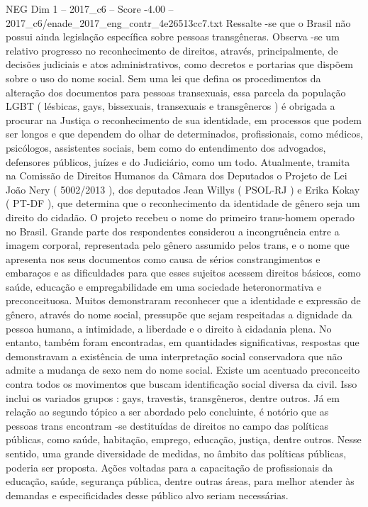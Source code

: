 \begin{textsample}{NEG Dim 1 – 2017\_c6 – Score -4.00 – 2017\_c6/enade\_2017\_eng\_contr\_4e26513cc7.txt}
Ressalte -se que o Brasil não possui ainda legislação específica sobre pessoas transgêneras.
Observa -se um relativo progresso no reconhecimento de direitos, através, principalmente, de decisões judiciais e atos administrativos, como decretos e portarias que dispõem sobre o uso do nome social.
Sem uma lei que defina os procedimentos da alteração dos documentos para pessoas transexuais, essa parcela da população LGBT ( lésbicas, gays, bissexuais, transexuais e transgêneros ) é obrigada a procurar na Justiça o reconhecimento de sua identidade, em processos que podem ser longos e que dependem do olhar de determinados, profissionais, como médicos, psicólogos, assistentes sociais, bem como do entendimento dos advogados, defensores públicos, juízes e do Judiciário, como um todo.
Atualmente, tramita na Comissão de Direitos Humanos da Câmara dos Deputados o Projeto de Lei João Nery ( 5002/2013 ), dos deputados Jean Willys ( PSOL-RJ ) e Erika Kokay ( PT-DF ), que determina que o reconhecimento da identidade de gênero seja um direito do cidadão.
O projeto recebeu o nome do primeiro trans-homem operado no Brasil.
Grande parte dos respondentes considerou a incongruência entre a imagem corporal, representada pelo gênero assumido pelos trans, e o nome que apresenta nos seus documentos como causa de sérios constrangimentos e embaraços e as dificuldades para que esses sujeitos acessem direitos básicos, como saúde, educação e empregabilidade em uma sociedade heteronormativa e preconceituosa.
Muitos demonstraram reconhecer que a identidade e expressão de gênero, através do nome social, pressupõe que sejam respeitadas a dignidade da pessoa humana, a intimidade, a liberdade e o direito à cidadania plena.
No entanto, também foram encontradas, em quantidades significativas, respostas que demonstravam a existência de uma interpretação social conservadora que não admite a mudança de sexo nem do nome social.
Existe um acentuado preconceito contra todos os movimentos que buscam identificação social diversa da civil.
Isso inclui os variados grupos : gays, travestis, transgêneros, dentre outros.
Já em relação ao segundo tópico a ser abordado pelo concluinte, é notório que as pessoas trans encontram -se destituídas de direitos no campo das políticas públicas, como saúde, habitação, emprego, educação, justiça, dentre outros.
Nesse sentido, uma grande diversidade de medidas, no âmbito das políticas públicas, poderia ser proposta.
Ações voltadas para a capacitação de profissionais da educação, saúde, segurança pública, dentre outras áreas, para melhor atender às demandas e especificidades desse público alvo seriam necessárias.

\end{textsample}
